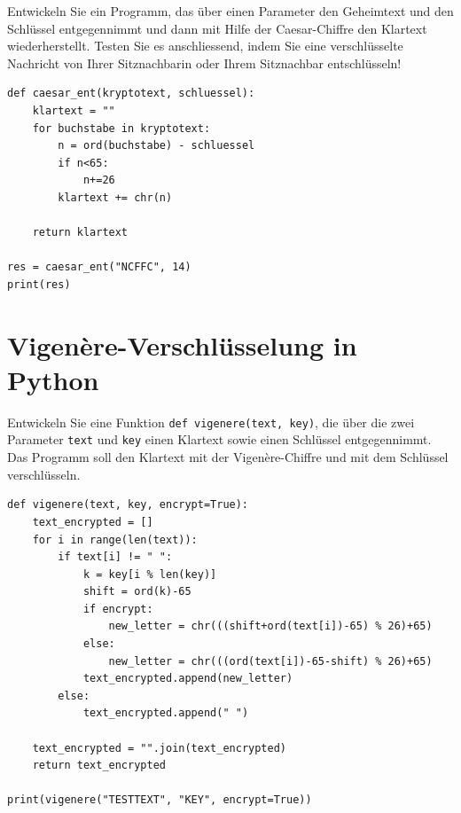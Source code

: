 \begin{myexercise}
Entwickeln Sie ein Programm, das über einen Parameter den Geheimtext und den Schlüssel entgegennimmt und dann mit Hilfe der Caesar-Chiffre den Klartext wiederherstellt. Testen Sie es anschliessend, indem Sie eine verschlüsselte Nachricht von Ihrer Sitznachbarin oder Ihrem Sitznachbar entschlüsseln!

\begin{myanswer}
\begin{lstlisting}
def caesar_ent(kryptotext, schluessel):
    klartext = ""
    for buchstabe in kryptotext:
        n = ord(buchstabe) - schluessel
        if n<65:
            n+=26
        klartext += chr(n)
        
    return klartext

res = caesar_ent("NCFFC", 14)
print(res)
\end{lstlisting}
\end{myanswer}
\end{myexercise}

\section{Vigenère-Verschlüsselung in Python}

\begin{myexercise}\label{ex:vig}
Entwickeln Sie eine Funktion \lstinline|def vigenere(text, key)|, die über die zwei Parameter \lstinline|text| und \lstinline|key| einen Klartext sowie einen Schlüssel entgegennimmt. Das Programm soll den Klartext mit der Vigenère-Chiffre und mit dem Schlüssel verschlüsseln.
\begin{myanswer}
\begin{lstlisting}
def vigenere(text, key, encrypt=True):
    text_encrypted = []
    for i in range(len(text)):
        if text[i] != " ":
            k = key[i % len(key)]
            shift = ord(k)-65
            if encrypt:
                new_letter = chr(((shift+ord(text[i])-65) % 26)+65)
            else:
                new_letter = chr(((ord(text[i])-65-shift) % 26)+65)
            text_encrypted.append(new_letter)
        else:
            text_encrypted.append(" ")

    text_encrypted = "".join(text_encrypted)
    return text_encrypted
    
print(vigenere("TESTTEXT", "KEY", encrypt=True))
\end{lstlisting}
\end{myanswer}
\end{myexercise}

